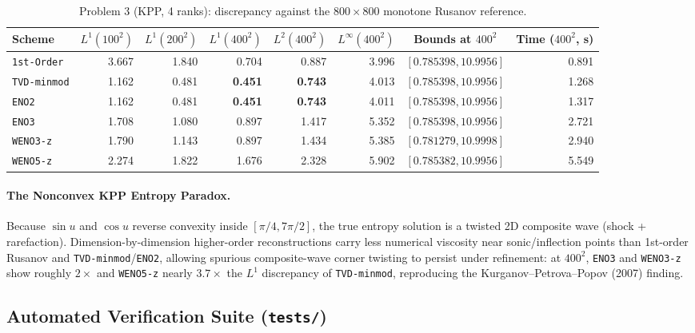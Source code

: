 \documentclass[11pt,a4paper]{article}
\theoremstyle{definition}
\newcommand{\code}[1]{\texttt{#1}}
\begin{document}
\begin{table}[h]
\centering\scriptsize\setlength{\tabcolsep}{4pt}
\caption{Problem 3 (KPP, 4 ranks): discrepancy against the $800\times 800$ monotone Rusanov reference.}
\label{tab:p3}
\begin{tabular}{@{}lrrrrrcr@{}}
\toprule
\textbf{Scheme} & $L^1(100^2)$ & $L^1(200^2)$ & $L^1(400^2)$ & $L^2(400^2)$ & $L^\infty(400^2)$ & \textbf{Bounds at} $400^2$ & \textbf{Time ($400^2$, s)} \\
\midrule
\code{1st-Order}  & 3.667 & 1.840 & 0.704 & 0.887 & 3.996 & $[0.785398, 10.9956]$ & 0.891 \\
\code{TVD-minmod} & 1.162 & 0.481 & \textbf{0.451} & \textbf{0.743} & 4.013 & $[0.785398, 10.9956]$ & 1.268 \\
\code{ENO2}       & 1.162 & 0.481 & \textbf{0.451} & \textbf{0.743} & 4.011 & $[0.785398, 10.9956]$ & 1.317 \\
\code{ENO3}       & 1.708 & 1.080 & 0.897 & 1.417 & 5.352 & $[0.785398, 10.9956]$ & 2.721 \\
\code{WENO3-z}    & 1.790 & 1.143 & 0.897 & 1.434 & 5.385 & $[0.781279, 10.9998]$ & 2.940 \\
\code{WENO5-z}    & 2.274 & 1.822 & 1.676 & 2.328 & 5.902 & $[0.785382, 10.9956]$ & 5.549 \\
\bottomrule
\end{tabular}
\end{table}

\paragraph{The Nonconvex KPP Entropy Paradox.}
Because $\sin u$ and $\cos u$ reverse convexity inside $[\pi/4, 7\pi/2]$, the true entropy solution is a twisted 2D composite wave (shock + rarefaction). Dimension-by-dimension higher-order reconstructions carry less numerical viscosity near sonic/inflection points than 1st-order Rusanov and \code{TVD-minmod}/\code{ENO2}, allowing spurious composite-wave corner twisting to persist under refinement: at $400^2$, \code{ENO3} and \code{WENO3-z} show roughly $2\times$ and \code{WENO5-z} nearly $3.7\times$ the $L^1$ discrepancy of \code{TVD-minmod}, reproducing the Kurganov--Petrova--Popov (2007) finding.

\subsection{Automated Verification Suite (\code{tests/})}
\end{document}
